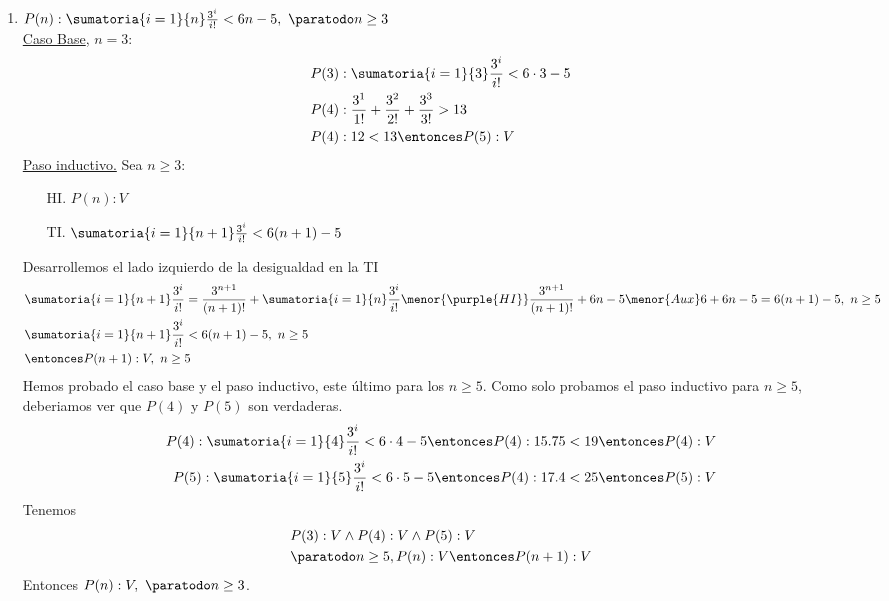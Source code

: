 \begin{enumerate}[label=\roman*)]
  \item 
          $P(n): 
                 \sumatoria{i=1}{n} \frac{3^i}{i!} < 6n - 5, \ \paratodo n \geq 3$ \\
        \underline{Caso Base}, $n = 3$:
        \begin{align*}
           & P(3): \sumatoria{i=1}{3} \frac{3^i}{i!} < 6 \cdot 3 - 5          \\
           & P(4): \frac{3^1}{1!} + \frac{3^2}{2!} + \frac{3^3}{3!} > 13 \\
           & P(4): 12 < 13 \entonces P(5):V
        \end{align*}
        \underline{Paso inductivo.} Sea $n \geq 3$:
        \begin{enumerate}
          \item[HI.] $P(n): V$
          \item[TI.] $ \sumatoria{i=1}{n+1} \frac{3^i}{i!} < 6(n+1) - 5$
        \end{enumerate}
        Desarrollemos el lado izquierdo de la desigualdad en la TI
        \begin{align*}
           & \sumatoria{i=1}{n+1} \frac{3^i}{i!} = \frac{3^{n+1}}{(n+1)!} + \sumatoria{i=1}{n}  \frac{3^i}{i!}
                \menor{\purple{HI}}
                \frac{3^{n+1}}{(n+1)!} + 6n - 5
                \menor{Aux}
                6 + 6n - 5 = 6(n+1) - 5,\ n \geq 5 \\
           & \sumatoria{i=1}{n+1} \frac{3^i}{i!} < 6(n+1) - 5, \ n \geq 5                                                        \\
           & \entonces P(n+1):V, \ n \geq 5
        \end{align*}
        Hemos probado el caso base y el paso inductivo, este último para los $n \geq 5$. Como solo probamos el
        paso inductivo para $n \geq 5$, deberiamos ver que $P(4)$ y $P(5)$ son verdaderas.
        \begin{align*}
          P(4): \sumatoria{i=1}{4} \frac{3^i}{i!} < 6 \cdot 4 - 5 \entonces P(4): 15.75 < 19 \entonces P(4):V \\
          P(5): \sumatoria{i=1}{5} \frac{3^i}{i!} < 6 \cdot 5 - 5 \entonces P(4): 17.4 < 25 \entonces P(5):V
        \end{align*}
        Tenemos
        \begin{align*}
           & P(3):V \land P(4):V \land P(5):V           \\
           & \paratodo n \geq 5, P(n):V \entonces P(n+1):V
        \end{align*}
        Entonces $P(n):V, \ \paratodo n \geq 3$.


\end{enumerate}
